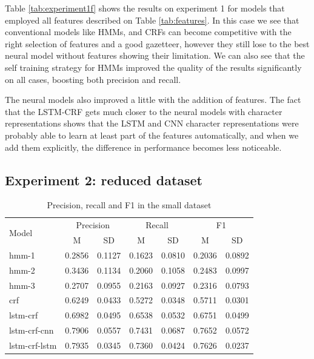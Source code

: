 \documentclass[sigconf]{acmart}
\begin{document}
Table \ref{tab:experiment1f} shows the results on experiment 1 for models
that employed all features described on Table \ref{tab:features}. In this case
we see that conventional models like HMMs, and CRFs can become competitive with
the right selection of features and a good gazetteer, however they still lose
to the best neural model without features showing their limitation. We can also
see that the self training strategy for HMMs improved the quality of the results
significantly on all cases, boosting both precision and recall.

The neural models also improved a little with the addition of features. The fact that 
the LSTM-CRF gets much closer to the neural models with character representations
shows that the LSTM and CNN character representations were probably able to learn 
at least part of the features automatically, and when we add them explicitly,
the difference in performance becomes less noticeable.

\subsection{Experiment 2: reduced dataset}

\begin{table}[h]
  \small
  \begin{center}
    \begin{tabular}{ lllllll }
      \toprule
      \multirow{2}{*}{Model} & \multicolumn{2}{c}{Precision} & \multicolumn{2}{c}{Recall} & \multicolumn{2}{c}{F1} \\
                             & \multicolumn{1}{c}{\tiny{M}} & \multicolumn{1}{c}{\tiny{SD}}
			     & \multicolumn{1}{c}{\tiny{M}} & \multicolumn{1}{c}{\tiny{SD}}
			     & \multicolumn{1}{c}{\tiny{M}} & \multicolumn{1}{c}{\tiny{SD}} \\
      \midrule
      hmm-1	      & 0.2856 & 0.1127 & 0.1623 & 0.0810 & 0.2036 & 0.0892 \\
      hmm-2	      & 0.3436 & 0.1134 & 0.2060 & 0.1058 & 0.2483 & 0.0997 \\
      hmm-3	      & 0.2707 & 0.0955 & 0.2163 & 0.0927 & 0.2316 & 0.0793 \\
      crf	      & 0.6249 & 0.0433 & 0.5272 & 0.0348 & 0.5711 & 0.0301 \\
      lstm-crf	      & 0.6982 & 0.0495 & 0.6538 & 0.0532 & 0.6751 & 0.0499 \\
      lstm-crf-cnn    & 0.7906 & 0.0557 & 0.7431 & 0.0687 & 0.7652 & 0.0572 \\
      lstm-crf-lstm   & 0.7935 & 0.0345 & 0.7360 & 0.0424 & 0.7626 & 0.0237 \\
      \bottomrule
    \end{tabular}
  \end{center}
  \caption{Precision, recall and F1 in the small dataset}
  \label{tab:experiment2}
\end{table}
\end{document}
